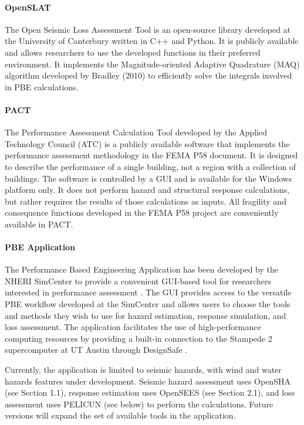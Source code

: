 \paragraph{OpenSLAT} The Open Seismic Loss Assessment Tool is an open-source library developed at the University of Canterbury written in C++ and Python. It is publicly available and allows researchers to use the developed functions in their preferred environment. It implements the Magnitude-oriented Adaptive Quadrature (MAQ) algorithm developed by Bradley (2010) to efficiently solve the integrals involved in PBE calculations.

\paragraph{PACT} The Performance Assessment Calculation Tool developed by the Applied Technology Council (ATC) is a publicly available software that implements the performance assessment methodology in the FEMA P58 document. It is designed to describe the performance of a single building, not a region with a collection of buildings. The software is controlled by a GUI and is available for the Windows platform only. It does not perform hazard and structural response calculations, but rather requires the results of those calculations as inputs. All fragility and consequence functions developed in the FEMA P58 project are conveniently available in PACT.

\paragraph{PBE Application} The Performance Based Engineering Application has been developed by the NHERI SimCenter to provide a convenient GUI-based tool for researchers interested in performance assessment \citep{mckenna2018performance}. The GUI provides access to the versatile PBE workflow developed at the SimCenter and allows users to choose the tools and methods they wish to use for hazard estimation, response simulation, and loss assessment. The application facilitates the use of high-performance computing resources by providing a built-in connection to the Stampede 2 supercomputer at UT Austin through DesignSafe \citep{rathje2017designsafe}.

Currently, the application is limited to seismic hazards, with wind and water hazards features under development. Seismic hazard assessment uses OpenSHA (see Section 1.1), response estimation uses OpenSEES (see Section 2.1), and loss assessment uses PELICUN (see below) to perform the calculations. Future versions will expand the set of available tools in the application.

